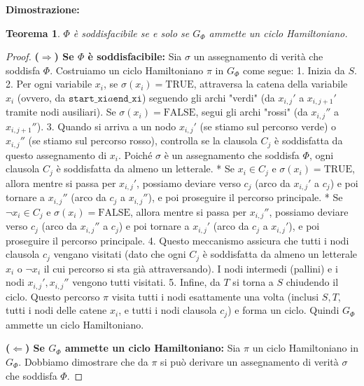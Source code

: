 \documentclass[a4paper, 11pt]{book} %
\newtheorem{theorem}{Teorema}[section]
\theoremstyle{definition}
\begin{document}
\textbf{Dimostrazione:}
\begin{theorem}
$\Phi$ è soddisfacibile se e solo se $G_\Phi$ ammette un ciclo Hamiltoniano.
\end{theorem}
\begin{proof}
\textbf{($\Rightarrow$) Se $\Phi$ è soddisfacibile:}
Sia $\sigma$ un assegnamento di verità che soddisfa $\Phi$. Costruiamo un ciclo Hamiltoniano $\pi$ in $G_\Phi$ come segue:
1.  Inizia da $S$.
2.  Per ogni variabile $x_i$, se $\sigma(x_i) = \text{TRUE}$, attraversa la catena della variabile $x_i$ (ovvero, da $\texttt{start\_xi} a \texttt{end\_xi}$) seguendo gli archi "verdi" (da $x_{i,j}'$ a $x_{i,j+1}'$ tramite nodi ausiliari). Se $\sigma(x_i) = \text{FALSE}$, segui gli archi "rossi" (da $x_{i,j}''$ a $x_{i,j+1}''$).
3.  Quando si arriva a un nodo $x_{i,j}'$ (se stiamo sul percorso verde) o $x_{i,j}''$ (se stiamo sul percorso rosso), controlla se la clausola $C_j$ è soddisfatta da questo assegnamento di $x_i$. Poiché $\sigma$ è un assegnamento che soddisfa $\Phi$, ogni clausola $C_j$ è soddisfatta da almeno un letterale.
    *   Se $x_i \in C_j$ e $\sigma(x_i) = \text{TRUE}$, allora mentre si passa per $x_{i,j}'$, possiamo deviare verso $c_j$ (arco da $x_{i,j}'$ a $c_j$) e poi tornare a $x_{i,j}''$ (arco da $c_j$ a $x_{i,j}''$), e poi proseguire il percorso principale.
    *   Se $\neg x_i \in C_j$ e $\sigma(x_i) = \text{FALSE}$, allora mentre si passa per $x_{i,j}''$, possiamo deviare verso $c_j$ (arco da $x_{i,j}''$ a $c_j$) e poi tornare a $x_{i,j}'$ (arco da $c_j$ a $x_{i,j}'$), e poi proseguire il percorso principale.
4.  Questo meccanismo assicura che tutti i nodi clausola $c_j$ vengano visitati (dato che ogni $C_j$ è soddisfatta da almeno un letterale $x_i$ o $\neg x_i$ il cui percorso si sta già attraversando). I nodi intermedi (pallini) e i nodi $x_{i,j}', x_{i,j}''$ vengono tutti visitati.
5.  Infine, da $T$ si torna a $S$ chiudendo il ciclo.
Questo percorso $\pi$ visita tutti i nodi esattamente una volta (inclusi $S, T$, tutti i nodi delle catene $x_i$, e tutti i nodi clausola $c_j$) e forma un ciclo. Quindi $G_\Phi$ ammette un ciclo Hamiltoniano.

\textbf{($\Leftarrow$) Se $G_\Phi$ ammette un ciclo Hamiltoniano:}
Sia $\pi$ un ciclo Hamiltoniano in $G_\Phi$. Dobbiamo dimostrare che da $\pi$ si può derivare un assegnamento di verità $\sigma$ che soddisfa $\Phi$.


\end{proof}
\end{document}
